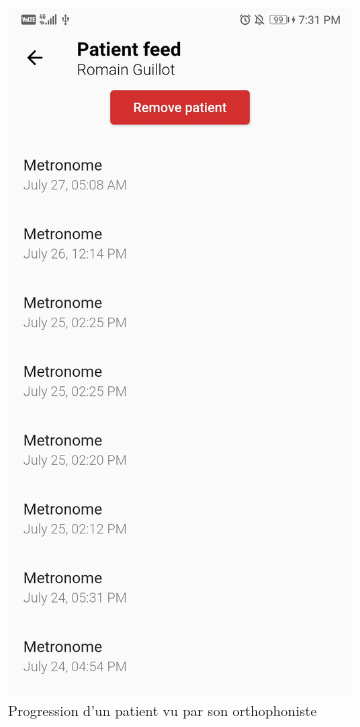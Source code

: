 \begin{appendices}
\begin{landscape}
\begin{figure}[h]
\begin{subfigure}{.25\textwidth}
    \includegraphics[width=.75\linewidth]{content/imgs/screen15.jpg}
    \caption{Progression d'un patient vu par son orthophoniste}
  \end{subfigure}%
  \begin{subfigure}{.25\textwidth}
    \centering

\end{subfigure}
\end{figure}
\end{landscape}
\end{appendices}
